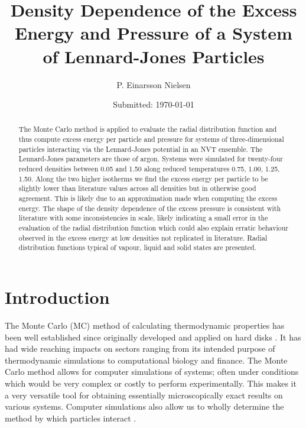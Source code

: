 \documentclass[10pt, twocolumn]{revtex4}    %
\begin{document}
                     


\title{Density Dependence of the Excess Energy and Pressure of a System of Lennard-Jones Particles} 
\date{Submitted: \today{}}
\author{P. Einarsson Nielsen}

\begin{abstract}
	The Monte Carlo method is applied to evaluate the radial distribution function and thus compute excess energy per particle and pressure for systems of three-dimensional particles interacting via the Lennard-Jones potential in an NVT ensemble. The Lennard-Jones parameters are those of argon. Systems were simulated for twenty-four reduced densities between \num{0.05} and \num{1.50} along reduced temperatures \num{0.75}, \num{1.00}, \num{1.25}, \num{1.50}. Along the two higher isotherms we find the excess energy per particle to be slightly lower than literature values across all densities but in otherwise good agreement. This is likely due to an approximation made when computing the excess energy. The shape of the density dependence of the excess pressure is consistent with literature with some inconsistencies in scale, likely indicating a small error in the evaluation of the radial distribution function which could also explain erratic behaviour observed in the excess energy at low densities not replicated in literature. Radial distribution functions typical of vapour, liquid and solid states are presented.
	
	
	

\end{abstract}

\maketitle
\thispagestyle{plain} %



\section{Introduction} \label{s:intro}

The Monte Carlo (MC) method of calculating thermodynamic properties has been well established since originally developed and applied on hard disks \cite{MC}. It has had wide reaching impacts on sectors ranging from its intended purpose of thermodynamic simulations to computational biology and finance. The Monte Carlo method allows for computer simulations of systems; often under conditions which would be very complex or costly to perform experimentally. This makes it a very versatile tool for obtaining essentially microscopically exact results on various systems. Computer simulations also allow us to wholly determine the method by which particles interact \cite{CompSimLiq}.
\end{document}
